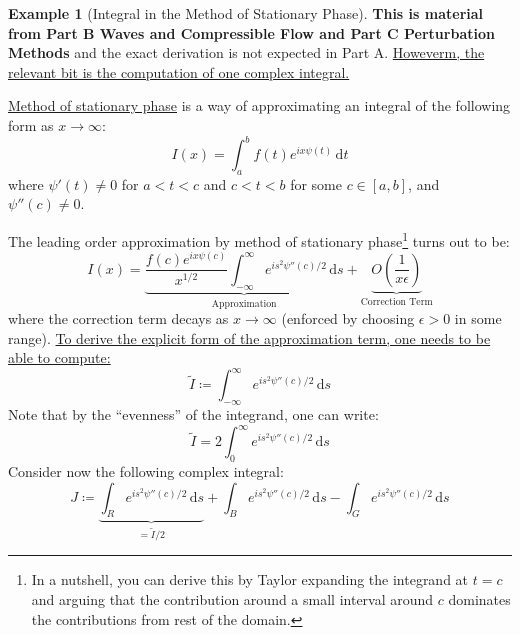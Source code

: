 \documentclass[a4paper, 12pt]{article}
\theoremstyle{definition}
\newtheorem{example}{Example}
\numberwithin{theorem}{section}
\numberwithin{definition}{section}
\numberwithin{exercise}{section}
\numberwithin{remark}{section}
\numberwithin{figure}{section}
\numberwithin{example}{section}
\newcommand{\intd}{\,\text{d}}
\begin{document}
\begin{example}[Integral in the Method of Stationary Phase]
    \textbf{This is material from Part B Waves and Compressible Flow and Part C Perturbation Methods}
    and the exact derivation is not expected in Part A.
    \ul{Howeverm, the relevant bit is the computation of one complex integral.}

    \ul{Method of stationary phase} is a way of approximating an integral of the following form as $x \rightarrow \infty$:
    \begin{equation*}
        I(x) = \int_a^b f(t) e^{i x \psi (t)} \intd t
    \end{equation*}
    where $\psi'(t) \neq 0$ for $a<t<c$ and $c<t<b$ for some $c \in \left[ a,b \right]$, and $\psi''(c) \neq 0$.

    The leading order approximation by method of stationary phase\footnote{In a nutshell, you can derive this by Taylor expanding the integrand at $t = c$ and arguing that the contribution around a small interval around $c$ dominates the contributions from rest of the domain.} turns out to be:
    \begin{equation*}
        I(x) = \underbrace{\frac{f(c) e^{i x \psi(c)}}{x^{1/2}} \int_{-\infty}^{\infty} e^{i s^2 \psi''(c) / 2} \intd s}_{\text{Approximation}} + \underbrace{O\left( \frac{1}{x \epsilon} \right)}_{\text{Correction Term}}
    \end{equation*}
    where the correction term decays as $x \rightarrow \infty$ (enforced by choosing $\epsilon>0$ in some range).
    \ul{To derive the explicit form of the approximation term, one needs to be able to compute:}
    \begin{equation*}
        \tilde I \coloneqq \int_{-\infty}^{\infty} e^{is^2 \psi''(c) / 2} \intd s
    \end{equation*}
    Note that by the ``evenness'' of the integrand, one can write:
    \begin{equation*}
        \tilde I = 2 \int_{0}^{\infty} e^{is^2 \psi''(c)/2} \intd s
    \end{equation*}
    Consider now the following complex integral:
    \begin{equation*}
        J \coloneqq
        \underbrace{
        \int_{R} e^{is^2 \psi''(c)/2} \intd s
    }_{= \tilde I / 2}
        +
        \int_{B} e^{is^2 \psi''(c)/2} \intd s
        -
        \int_{G} e^{is^2 \psi''(c)/2} \intd s
    \end{equation*}
    \begin{figure}[tbp]
        \centering

\end{figure}
\end{example}
\end{document}
